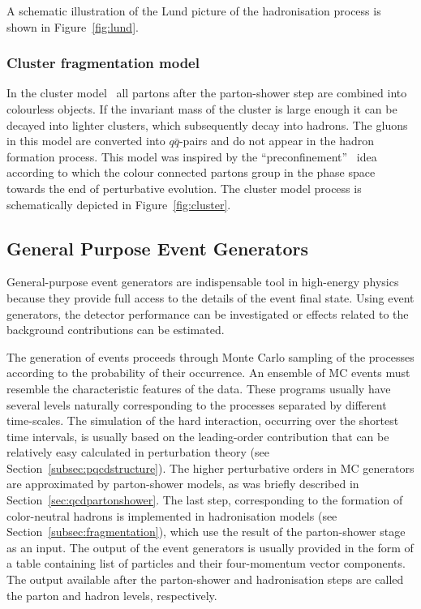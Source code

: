 A schematic illustration of the Lund picture of the hadronisation process is shown in Figure~\ref{fig:lund}.
\subsubsection{Cluster fragmentation model}
In the cluster model~\cite{Webber:1983if,Field:1982dg} all partons after the parton-shower step are combined into colourless objects. If the invariant mass of the cluster is large enough it can be decayed into lighter clusters, which subsequently decay into hadrons. The gluons in this model are converted into $q\bar{q}$-pairs and do not appear in the hadron formation process. This model was inspired by the ``preconfinement''~\cite{Amati:1979fg} idea according to which the colour connected partons group in the phase space towards the end of perturbative evolution. The cluster model process is schematically depicted in Figure~\ref{fig:cluster}.

\subsection{General Purpose Event Generators}
General-purpose event generators are indispensable tool in high-energy physics because they provide full access to the details of the event  final state. Using event generators, the detector performance can be investigated or effects related to the background contributions can be estimated.

The generation of events proceeds through Monte Carlo sampling of the processes according to the probability of their occurrence. An ensemble of MC events must resemble the characteristic features of the data. These programs usually have several levels naturally corresponding to the processes separated by different time-scales. The simulation of the hard interaction, occurring over the shortest time intervals, is usually based on the leading-order contribution that can be relatively easy calculated in perturbation theory (see Section~\ref{subsec:pqcdstructure}). The higher perturbative orders in MC generators are approximated by parton-shower models, as was briefly described in Section~\ref{sec:qcdpartonshower}. The last step, corresponding to the formation of color-neutral hadrons is implemented in hadronisation models (see Section~\ref{subsec:fragmentation}), which use the result of the parton-shower stage as an input. The output of the event generators is usually provided in the form of a table containing list of particles and their four-momentum vector components. The output available after the parton-shower and hadronisation steps are called the parton and hadron levels, respectively. 

